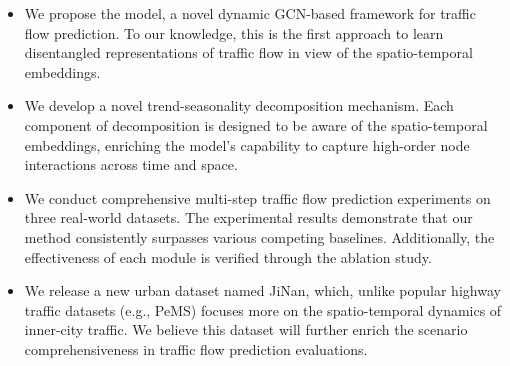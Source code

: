 \begin{itemize}

    \item We propose the \model model, a novel dynamic GCN-based framework for traffic flow prediction. To our knowledge, this is the first approach to learn disentangled representations of traffic flow in view of the spatio-temporal embeddings.
    \item We develop a novel trend-seasonality decomposition mechanism. Each component of decomposition is designed to be aware of the spatio-temporal embeddings, enriching the model's capability to capture high-order node interactions across time and space.
    \item We conduct comprehensive multi-step traffic flow prediction experiments on three real-world datasets. The experimental results demonstrate that our method consistently surpasses various competing baselines. Additionally, the effectiveness of each module is verified through the ablation study.
    \item We release a new urban dataset named JiNan, which, unlike popular highway traffic datasets (e.g., PeMS) focuses more on the spatio-temporal dynamics of inner-city traffic. We believe this dataset will further enrich the scenario comprehensiveness in traffic flow prediction evaluations.
    
\end{itemize}